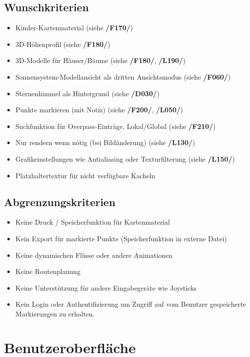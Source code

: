 \documentclass[10pt]{scrreprt}
\begin{document}
\section{Wunschkriterien}
\begin{itemize}
\item Kinder-Kartenmaterial (siehe \textbf{/F170/})
\item 3D-Höhenprofil (siehe \textbf{/F180/})
\item 3D-Modelle für Häuser/Bäume (siehe \textbf{/F180/}, \textbf{/L190/})
\item Sonnensystem-Modellansicht als dritten Ansichtsmodus (siehe \textbf{/F060/})
\item Sternenhimmel als Hintergrund (siehe \textbf{/D030/})
\item Punkte markieren (mit Notiz) (siehe \textbf{/F200/}, \textbf{/L050/})
\item Suchfunktion für Overpass-Einträge, Lokal/Global (siehe \textbf{/F210/})
\item Nur rendern wenn nötig (bei Bildänderung) (siehe \textbf{/L130/})
\item Grafikeinstellungen wie Antialiasing oder Texturfilterung (siehe \textbf{/L150/})
\item Platzhaltertextur für nicht verfügbare Kacheln
\end{itemize}

\section{Abgrenzungskriterien}
\begin{itemize}
\item Keine Druck / Speicherfunktion für Kartenmaterial
\item Kein Export für markierte Punkte (Speicherfunktion in externe Datei)
\item Keine dynamischen Flüsse oder andere Animationen
\item Keine Routenplanung
\item Keine Unterstützung für andere Eingabegeräte wie Joysticks
\item Kein Login oder Authentifizierung um Zugriff auf vom Benutzer gespeicherte Markierungen zu erhalten.
\end{itemize}


\chapter{Benutzeroberfläche}
\end{document}

